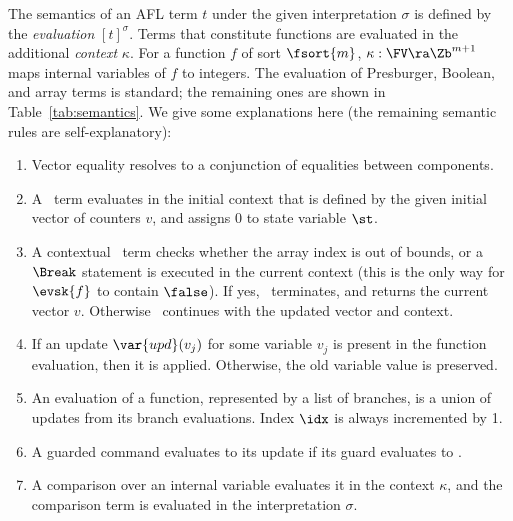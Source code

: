 The semantics of an AFL term $t$ under the given interpretation $\sigma$ is defined by the \emph{evaluation} $\left[ t \right]^\sigma$. 
Terms that constitute functions are evaluated in the additional \emph{context} $\kappa$. For a function $f$ of sort $\fsort{m}$, $\kappa: \FV \ra \Zb^{m+1}$ maps internal variables of $f$ to integers. 
The evaluation of Presburger, Boolean, and array terms is standard; the remaining ones are shown in Table~\ref{tab:semantics}. We give some explanations here (the remaining semantic rules are self-explanatory):
\begin{enumerate}
\item Vector equality resolves to a conjunction of equalities between components.
\item A \Fold\ term evaluates in the initial context that is defined by the given initial vector of counters $v$, and assigns 0 to state variable $\st$.
\item A contextual \Fold\ term checks whether the array index is out of bounds, or a $\Break$ statement is executed in the current context (this is the only way for $\evsk{f}$ to contain $\false$). If yes, \Fold\ terminates, and returns the current vector $v$. Otherwise \Fold\ continues with the updated vector and context.
\item If an update $\var{upd}(v_j)$ for some variable $v_j$ is present in the function evaluation, then it is applied. Otherwise, the old variable value is preserved.
\item An evaluation of a function, represented by a list of branches, is a union of updates from its branch evaluations. Index $\idx$ is always incremented by 1.
\item A guarded command evaluates to its update if its guard evaluates to .
\item A comparison over an internal variable evaluates it in the context $\kappa$, and the comparison term is evaluated in the interpretation $\sigma$.
\end{enumerate}






















